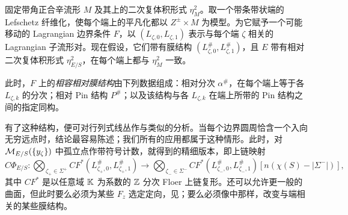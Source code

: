固定带角正合辛流形 $M$ 及其上的二次复体积形式 $\eta_M^2$。取一个带条带状端的 Lefschetz 纤维化，使每个端上的平凡化都以 $Z^\pm\times M$ 为模型。为它赋予一个可能移动的 Lagrangian 边界条件 $F$，以 $(L_{\zeta,0},L_{\zeta,1})$ 表示与每个端 $\zeta$ 相关的 Lagrangian 子流形对。现在假设，它们带有膜结构 $(L_{\zeta,0}^\#,L_{\zeta,1}^\#)$，且 $E$ 带有相对二次复体积形式 $\eta^2_{E/S}$，在每个端上都与 $\eta_M^2$ 一致。
\begin{definition*}
此时，$F$ 上的\emph{相容相对膜结构}由下列数据组成：相对分次 $\alpha^\#$，在每个端上等于各 $L_{\zeta,k}$ 的分次；相对 Pin 结构 $P^\#$；以及该结构与各 $L_{\zeta,k}$ 在端上所带的 Pin 结构之间的指定同构。
\end{definition*}
有了这种结构，便可对行列式线丛作与类似的分析。当每个边界圆周恰含一个入向无穷远点时，结论最容易陈述；我们所有的应用都属于这种情形。此时，对
$\mathcal M_{E/S}(\{y_\zeta\})$ 中孤立点作带符号计数，就得到的精细版本，即上链映射
\[
C\Phi_{E/S}:\bigotimes_{\zeta_+\in\Sigma^+}CF^*(L_{\zeta_+,0}^\#,L_{\zeta_+,1}^\#)
\longrightarrow\bigotimes_{\zeta_-\in\Sigma^-}CF^*(L_{\zeta_-,0}^\#,L_{\zeta_-,1}^\#)[n(\chi(S)-|\Sigma^-|)],
\]
其中 $CF^*$ 是以任意域 $\mathbb K$ 为系数的 $\mathbb Z$ 分次 Floer 上链复形。还可以允许更一般的曲面，但此时要么必须为某些 $F_z$ 选定定向，见；要么必须像中那样，改变与端相关的某些膜结构。
